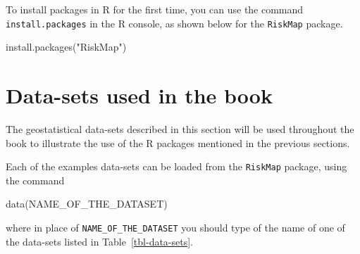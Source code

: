 \documentclass[
  letterpaper,
]{krantz}
\newenvironment{Shaded}{\begin{snugshade}}{\end{snugshade}}
\newcommand{\FunctionTok}[1]{\textcolor[rgb]{0.28,0.35,0.67}{#1}}
\newcommand{\NormalTok}[1]{\textcolor[rgb]{0.00,0.23,0.31}{#1}}
\newcommand{\StringTok}[1]{\textcolor[rgb]{0.13,0.47,0.30}{#1}}
\begin{document}
To install packages in R for the first time, you can use the command
\texttt{install.packages} in the R console, as shown below for the
\texttt{RiskMap} package.

\begin{Shaded}
\begin{Highlighting}[]
\FunctionTok{install.packages}\NormalTok{(}\StringTok{"RiskMap"}\NormalTok{)}
\end{Highlighting}
\end{Shaded}

\hypertarget{sec-examples-ch1}{%
\section{Data-sets used in the book}\label{sec-examples-ch1}}

The geostatistical data-sets described in this section will be used
throughout the book to illustrate the use of the R packages mentioned in
the previous sections.

Each of the examples data-sets can be loaded from the \texttt{RiskMap}
package, using the command

\begin{Shaded}
\begin{Highlighting}[]
\FunctionTok{data}\NormalTok{(NAME\_OF\_THE\_DATASET)}
\end{Highlighting}
\end{Shaded}

where in place of \texttt{NAME\_OF\_THE\_DATASET} you should type of the
name of one of the data-sets listed in Table~\ref{tbl-data-sets}.
\end{document}
